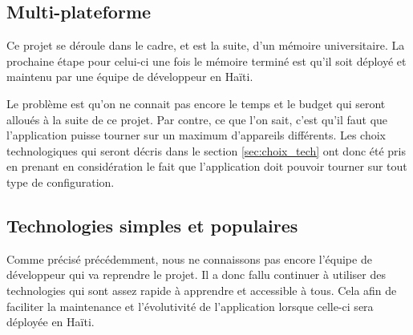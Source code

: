 \documentclass{EPL-master-thesis-covers-FR}
\begin{document}
			\subsection*{Multi-plateforme}
			\label{sec:multi}
				Ce projet se déroule dans le cadre, et est la suite, d'un mémoire universitaire. La prochaine étape pour celui-ci une fois le mémoire terminé est qu'il soit déployé et maintenu par une équipe de développeur en Haïti. 
				
				Le problème est qu'on ne connait pas encore le temps et le budget qui seront alloués à la suite de ce projet. Par contre, ce que l'on sait, c'est qu'il faut que l'application puisse tourner sur un maximum d'appareils différents. Les choix technologiques qui seront décris dans le section \ref{sec:choix_tech} ont donc été pris en prenant en considération le fait que l'application doit pouvoir tourner sur tout type de configuration.
				
			\subsection*{Technologies simples et populaires}
				Comme précisé précédemment, nous ne connaissons pas encore l'équipe de développeur qui va reprendre le projet. Il a donc fallu continuer à utiliser des technologies qui sont assez rapide à apprendre et accessible à tous. Cela afin de faciliter la maintenance et l'évolutivité de l'application lorsque celle-ci sera déployée en Haïti.	
				
\end{document}
